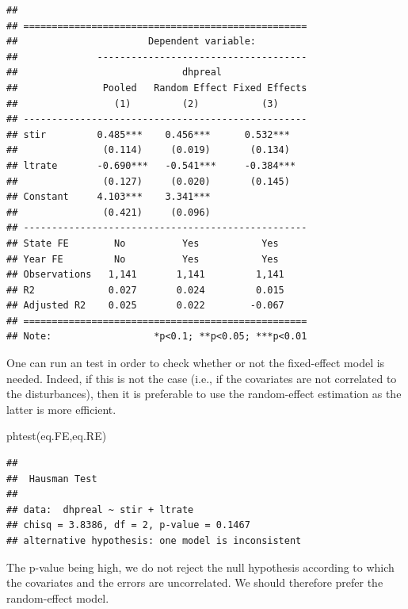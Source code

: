 \documentclass[
  12pt,
]{book}
\newenvironment{Shaded}{\begin{snugshade}}{\end{snugshade}}
\newcommand{\FunctionTok}[1]{\textcolor[rgb]{0.00,0.00,0.00}{#1}}
\newcommand{\NormalTok}[1]{#1}
\theoremstyle{definition}
\theoremstyle{definition}
\theoremstyle{definition}
\theoremstyle{definition}
\theoremstyle{remark}
\begin{document}
\begin{verbatim}
## 
## ==================================================
##                       Dependent variable:         
##              -------------------------------------
##                             dhpreal               
##               Pooled   Random Effect Fixed Effects
##                 (1)         (2)           (3)     
## --------------------------------------------------
## stir         0.485***    0.456***      0.532***   
##               (0.114)     (0.019)       (0.134)   
## ltrate       -0.690***   -0.541***     -0.384***  
##               (0.127)     (0.020)       (0.145)   
## Constant     4.103***    3.341***                 
##               (0.421)     (0.096)                 
## --------------------------------------------------
## State FE        No          Yes           Yes     
## Year FE         No          Yes           Yes     
## Observations   1,141       1,141         1,141    
## R2             0.027       0.024         0.015    
## Adjusted R2    0.025       0.022        -0.067    
## ==================================================
## Note:                  *p<0.1; **p<0.05; ***p<0.01
\end{verbatim}

One can run an \citet{Hausman_1978} test in order to check whether or not the fixed-effect model is needed. Indeed, if this is not the case (i.e., if the covariates are not correlated to the disturbances), then it is preferable to use the random-effect estimation as the latter is more efficient.

\begin{Shaded}
\begin{Highlighting}[]
\FunctionTok{phtest}\NormalTok{(eq.FE,eq.RE)}
\end{Highlighting}
\end{Shaded}

\begin{verbatim}
## 
##  Hausman Test
## 
## data:  dhpreal ~ stir + ltrate
## chisq = 3.8386, df = 2, p-value = 0.1467
## alternative hypothesis: one model is inconsistent
\end{verbatim}

The p-value being high, we do not reject the null hypothesis according to which the covariates and the errors are uncorrelated. We should therefore prefer the random-effect model.
\end{document}
